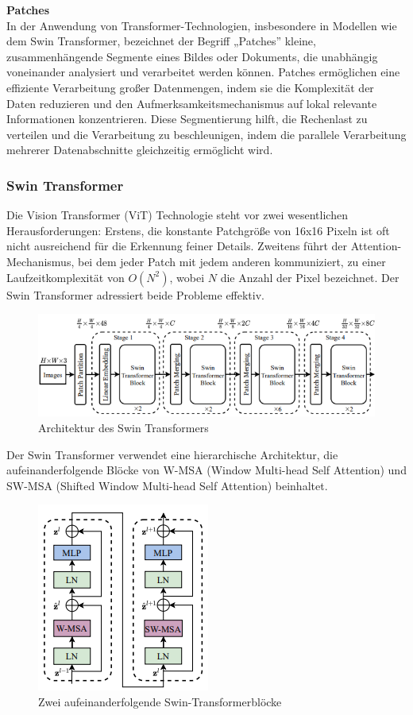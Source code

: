 \documentclass[12pt,a4paper,twoside]{article}
\newcommand{\smallbold}[1]{\noindent\textbf{\small #1}}
\begin{document}
\smallbold{Patches}\\
In der Anwendung von Transformer-Technologien, insbesondere in Modellen wie dem Swin Transformer, bezeichnet der Begriff „Patches” kleine, zusammenhängende Segmente eines Bildes oder Dokuments, die unabhängig voneinander analysiert und verarbeitet werden können. Patches ermöglichen eine effiziente Verarbeitung großer Datenmengen, indem sie die Komplexität der Daten reduzieren und den Aufmerksamkeitsmechanismus auf lokal relevante Informationen konzentrieren. Diese Segmentierung hilft, die Rechenlast zu verteilen und die Verarbeitung zu beschleunigen, indem die parallele Verarbeitung mehrerer Datenabschnitte gleichzeitig ermöglicht wird.




\subsubsection{Swin Transformer}

Die Vision Transformer (ViT) Technologie steht vor zwei wesentlichen Herausforderungen: Erstens, die konstante Patchgröße von 16x16 Pixeln ist oft nicht ausreichend für die Erkennung feiner Details. Zweitens führt der Attention-Mechanismus, bei dem jeder Patch mit jedem anderen kommuniziert, zu einer Laufzeitkomplexität von \(O(N^2)\), wobei \(N\) die Anzahl der Pixel bezeichnet. Der Swin Transformer adressiert beide Probleme effektiv.

\begin{figure}[H]
    \centering
    \includegraphics[width=0.7\linewidth]{SWIN-Transformer-Architektur.png}
    \caption{Architektur des Swin Transformers}
    \label{fig:swin_arch}
\end{figure}

Der Swin Transformer verwendet eine hierarchische Architektur, die aufeinanderfolgende Blöcke von W-MSA (Window Multi-head Self Attention) und SW-MSA (Shifted Window Multi-head Self Attention) beinhaltet.
\begin{figure}[H]
    \centering
    \includegraphics[width=0.2\linewidth]{SWIN-Transformer-Block.png}
    \caption{Zwei aufeinanderfolgende Swin-Transformerblöcke}
    \label{fig:enter-label}
\end{figure}
\end{document}
